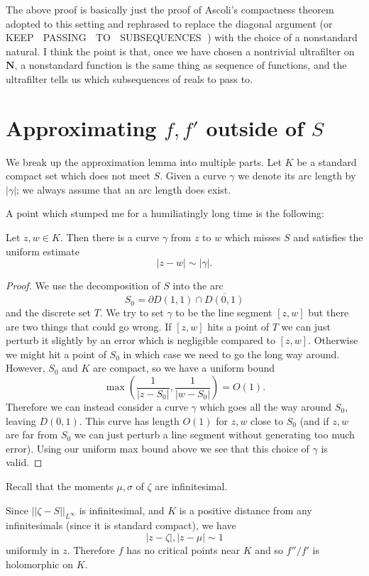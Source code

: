 \documentclass[12pt]{article}
\begin{document}
 The above proof is basically just the proof of Ascoli's compactness theorem adopted to this setting and rephrased to replace the diagonal argument (or 👏 KEEP 👏 PASSING 👏 TO 👏 SUBSEQUENCES 👏) with the choice of a nonstandard natural.
I think the point is that, once we have chosen a nontrivial ultrafilter on $\mathbf N$, a nonstandard function is the same thing as sequence of functions, and the ultrafilter tells us which subsequences of reals to pass to.

\section{Approximating $f,f'$ outside of $S$}
We break up the approximation lemma into multiple parts.
Let $K$ be a standard compact set which does not meet $S$.
Given a curve $\gamma$ we denote its arc length by $|\gamma|$; we always assume that an arc length does exist.

A point which stumped me for a humiliatingly long time is the following:
\begin{lemma}
Let $z, w \in K$. Then there is a curve $\gamma$ from $z$ to $w$ which misses $S$ and satisfies the uniform estimate
$$|z - w| \sim |\gamma|.$$
\end{lemma}
\begin{proof}
We use the decomposition of $S$ into the arc
$$S_0 = \partial D(1, 1) \cap \overline{D(0, 1)}$$
and the discrete set $T$. We try to set $\gamma$ to be the line segment $[z, w]$ but there are two things that could go wrong.
If $[z, w]$ hits a point of $T$ we can just perturb it slightly by an error which is negligible compared to $[z, w]$.
Otherwise we might hit a point of $S_0$ in which case we need to go the long way around.
However, $S_0$ and $K$ are compact, so we have a uniform bound
$$\max(\frac{1}{|z - S_0|}, \frac{1}{|w - S_0|}) = O(1).$$
Therefore we can instead consider a curve $\gamma$ which goes all the way around $S_0$, leaving $D(0, 1)$.
This curve has length $O(1)$ for $z, w$ close to $S_0$ (and if $z, w$ are far from $S_0$ we can just perturb a line segment without generating too much error).
Using our uniform max bound above we see that this choice of $\gamma$ is valid.
\end{proof}

Recall that the moments $\mu,\sigma$ of $\zeta$ are infinitesimal.

Since $||\zeta - S||_{L^\infty}$ is infinitesimal, and $K$ is a positive distance from any infinitesimals (since it is standard compact), we have
$$|z - \zeta|, |z - \mu| \sim 1$$
uniformly in $z$.
Therefore $f$ has no critical points near $K$ and so $f''/f'$ is holomorphic on $K$.
\end{document}
